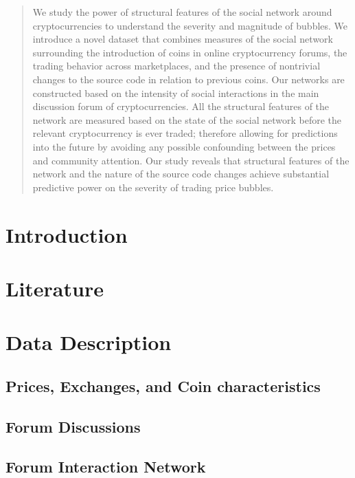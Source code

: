 \documentclass[letterpaper]{article}
\begin{document}
\begin{abstract}

We study the power of structural features of the social network around cryptocurrencies to understand the severity and magnitude of bubbles. 
We introduce a novel dataset that combines measures of the social network surrounding the introduction of coins in online cryptocurrency forums, the trading  behavior across marketplaces, and the presence of nontrivial changes to the source code in relation to previous coins.
Our networks are constructed based on the intensity of social interactions in the main discussion forum of cryptocurrencies. All the structural features of the network are measured based on the state of the social network before the relevant cryptocurrency is ever traded; therefore allowing for predictions into the future by avoiding any possible confounding between the prices and community attention.
Our study reveals that structural features of the network and the nature of the source code changes achieve substantial predictive power on the severity of trading price bubbles.

\end{abstract}

\section{Introduction}

\section{Literature}


\section{Data Description}
\subsection{Prices, Exchanges, and Coin characteristics} \label{data_nikete}



\subsection{Forum Discussions}


\subsection{Forum Interaction Network}

\end{document}
